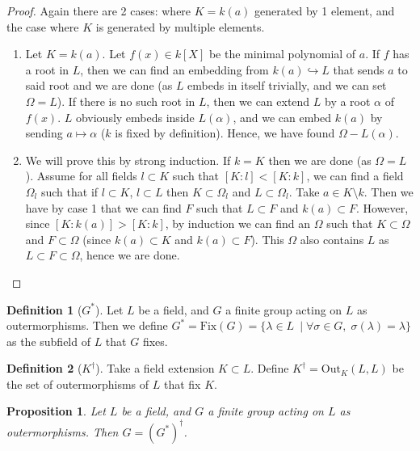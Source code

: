 \documentclass{article}
\theoremstyle{definition}
\newtheorem{defn}{Definition}[section]
\theoremstyle{plain}%
\newtheorem{prop}[thm]{Proposition}
\theoremstyle{remark}
\newcommand{\Out}{\text{Out}}
\begin{document}
\begin{proof}
Again there are 2 cases: where $K = k(a)$ generated by 1 element, and the case where $K$ is generated by multiple elements.
\begin{enumerate}
    \item Let $K = k(a)$. Let $f(x) \in k[X]$ be the minimal polynomial of $a$. If $f$ has a root in $L$, then we can find an embedding from $k(a) \hookrightarrow L$ that sends $a$ to said root and we are done (as $L$ embeds in itself trivially, and we can set $\Omega = L$). If there is no such root in $L$, then we can extend $L$ by a root $\alpha$ of $f(x)$. $L$ obviously embeds inside $L(\alpha)$, and we can embed $k(a)$ by sending $a \mapsto \alpha$ ($k$ is fixed by definition). Hence, we have found $\Omega - L(\alpha)$.
    
    \item We will prove this by strong induction. If $k = K$ then we are done (as $\Omega = L$). Assume for all fields $l \subset K$ such that $[K : l] < [K : k]$, we can find a field $\Omega_l$ such that if $l \subset K$, $l \subset L$ then $K \subset \Omega_l$ and $L \subset \Omega_l$. Take $a \in K \setminus k$. Then we have by case 1 that we can find $F$ such that $L \subset F$ and $k(a) \subset F$. However, since $[K : k(a)] > [K : k]$, by induction we can find an $\Omega$ such that $K \subset \Omega$ and $F \subset \Omega$ (since $k(a) \subset K$ and $k(a) \subset F$). This $\Omega$ also contains $L$ as $L \subset F \subset \Omega$, hence we are done.
\end{enumerate} 
\end{proof}

\begin{defn}[$G^*$]
Let $L$ be a field, and $G$ a finite group acting on $L$ as outermorphisms. Then we define $G^* = \text{Fix}(G) = \{\lambda \in L\ \; | \; \forall \sigma \in G, \; \sigma(\lambda) = \lambda\}$ as the subfield of $L$ that $G$ fixes.
\end{defn}

\begin{defn}[$K^{\dagger}$]
Take a field extension $K \subset L$. Define $K^{\dagger} = \Out_K(L, L)$ be the set of outermorphisms of $L$ that fix $K$.
\end{defn}


\begin{prop}\label{1st Galois proof}
Let $L$ be a field, and $G$ a finite group acting on $L$ as outermorphisms. Then $G = (G^*)^{\dagger}$.
\end{prop}
\end{document}
